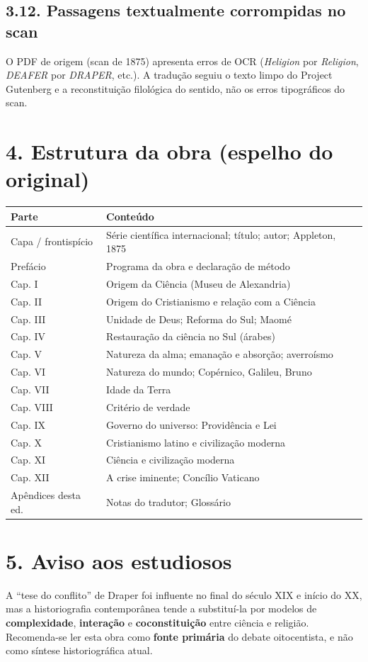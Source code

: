 \documentclass[11pt,a5paper,twoside,openany]{book}
\begin{document}
\subsection*{3.12. Passagens textualmente corrompidas no scan}
O PDF de origem (scan de 1875) apresenta erros de OCR (\textit{Heligion} por \textit{Religion}, \textit{DEAFER} por \textit{DRAPER}, etc.). A tradução seguiu o texto limpo do Project Gutenberg e a reconstituição filológica do sentido, não os erros tipográficos do scan.

\section*{4. Estrutura da obra (espelho do original)}
\begin{longtable}{p{} | p{}}
Parte & Conteúdo \\
\hline
Capa / frontispício & Série científica internacional; título; autor; Appleton, 1875 \\
Prefácio & Programa da obra e declaração de método \\
Cap. I & Origem da Ciência (Museu de Alexandria) \\
Cap. II & Origem do Cristianismo e relação com a Ciência \\
Cap. III & Unidade de Deus; Reforma do Sul; Maomé \\
Cap. IV & Restauração da ciência no Sul (árabes) \\
Cap. V & Natureza da alma; emanação e absorção; averroísmo \\
Cap. VI & Natureza do mundo; Copérnico, Galileu, Bruno \\
Cap. VII & Idade da Terra \\
Cap. VIII & Critério de verdade \\
Cap. IX & Governo do universo: Providência e Lei \\
Cap. X & Cristianismo latino e civilização moderna \\
Cap. XI & Ciência e civilização moderna \\
Cap. XII & A crise iminente; Concílio Vaticano \\
Apêndices desta ed. & Notas do tradutor; Glossário \\
\end{longtable}

\section*{5. Aviso aos estudiosos}
A “tese do conflito” de Draper foi influente no final do século XIX e início do XX, mas a historiografia contemporânea tende a substituí-la por modelos de \textbf{complexidade}, \textbf{interação} e \textbf{coconstituição} entre ciência e religião. Recomenda-se ler esta obra como \textbf{fonte primária} do debate oitocentista, e não como síntese historiográfica atual.
\end{document}
